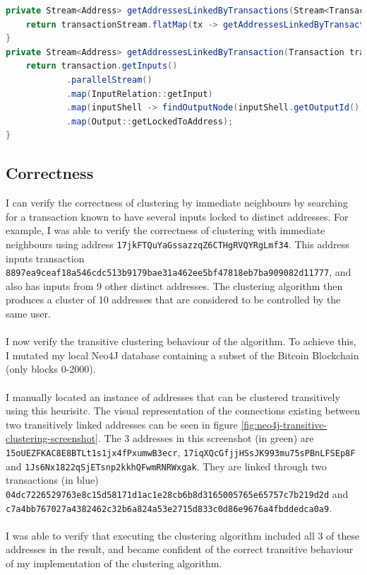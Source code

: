 \begin{lstlisting}[language=Java, caption={Java Implementation of on demand clustering}, label={lst:clustering-on-demand}, breaklines=true, basicstyle=\small]
private Stream<Address> getAddressesLinkedByTransactions(Stream<Transaction> transactionStream, Date start, Date end) {
    return transactionStream.flatMap(tx -> getAddressesLinkedByTransaction(tx, start, end));
}
private Stream<Address> getAddressesLinkedByTransaction(Transaction transaction, Date start, Date end) {
    return transaction.getInputs()
            .parallelStream()
            .map(InputRelation::getInput)
            .map(inputShell -> findOutputNode(inputShell.getOutputId(), start, end))
            .map(Output::getLockedToAddress);
}
\end{lstlisting}

\subsection{Correctness}


I can verify the correctness of clustering by immediate neighbours by searching for a transaction known to have several inputs locked to distinct addresses. For example, I was able to verify the correctness of clustering with immediate neighbours using address \texttt{17jkFTQuYaGssazzqZ6CTHgRVQYRgLmf34}. This address inputs transaction \\\texttt{8897ea9ceaf18a546cdc513b9179bae31a462ee5bf47818eb7ba909082d11777}, and also has inputs from 9 other distinct addresses. The clustering algorithm then produces a cluster of 10 addresses that are considered to be controlled by the same user. 
\\\\
I now verify the transitive clustering behaviour of the algorithm.  
To achieve this, I mutated my local Neo4J database containing a subset of the Bitcoin Blockchain (only blocks 0-2000). 
\\\\
I manually located an instance of addresses that can be clustered transitively using this heurisitc. The visual representation of the connections existing between two transitively linked addresses can be seen in figure \ref{fig:neo4j-transitive-clustering-screenshot}. The 3 addresses in this screenshot (in green) are \texttt{15oUEZFKAC8E8BTLt1s1jx4fPxumwB3ecr}, \texttt{17iqXQcGfjjHSsJK993mu75sPBnLFSEp8F} and \texttt{1Js6Nx1822qSjETsnp2kkhQFwmRNRWxgak}. They are linked through two transactions (in blue) \texttt{04dc7226529763e8c15d58171d1ac1e28cb6b8d3165005765e65757c7b219d2d} and \texttt{c7a4bb767027a4382462c32b6a824a53e2715d833c0d86e9676a4fbddedca0a9}. 
\\\\
I was able to verify that executing the clustering algorithm included all 3 of these addresses in the result, and became confident of the correct transitive behaviour of my implementation of the clustering algorithm. 

